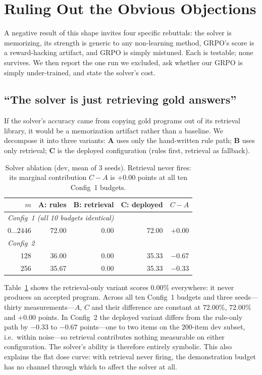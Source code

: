 \section{Ruling Out the Obvious Objections}
\label{sec:analysis}

A negative result of this shape invites four specific rebuttals: the solver is
memorizing, its strength is generic to any non-learning method, GRPO's score is
a reward-hacking artifact, and GRPO is simply mistuned. Each is testable; none
survives. We then report the one run we excluded, ask whether our GRPO is
simply under-trained, and state the solver's cost.

\subsection{``The solver is just retrieving gold answers''}

If the solver's accuracy came from copying gold programs out of its retrieval
library, it would be a memorization artifact rather than a baseline. We
decompose it into three variants: \textbf{A} uses only the hand-written rule
path; \textbf{B} uses only retrieval; \textbf{C} is the deployed configuration
(rules first, retrieval as fallback).

\begin{table}[t]
\centering
\small
\caption{Solver ablation (dev, mean of 3 seeds). Retrieval never fires: its
marginal contribution $C-A$ is $+0.00$ points at all ten Config~1 budgets.}
\label{tab:ablation}
\begin{tabular}{rrrr r}
\toprule
$m$ & A: rules & B: retrieval & C: deployed & $C-A$ \\
\midrule
\multicolumn{5}{l}{\textit{Config~1 (all 10 budgets identical)}} \\
$0 \ldots 2446$ & 72.00 & 0.00 & 72.00 & $+0.00$ \\
\midrule
\multicolumn{5}{l}{\textit{Config~2}} \\
128 & 36.00 & 0.00 & 35.33 & $-0.67$ \\
256 & 35.67 & 0.00 & 35.33 & $-0.33$ \\
\bottomrule
\end{tabular}
\end{table}

Table~\ref{tab:ablation} shows the retrieval-only variant scores $0.00\%$
everywhere: it never produces an accepted program. Across all ten Config~1
budgets and three seeds---thirty measurements---$A$, $C$ and their difference
are constant at $72.00\%$, $72.00\%$ and $+0.00$ points. In Config~2 the
deployed variant differs from the rule-only path by $-0.33$ to $-0.67$
points---one to two items on the 200-item dev subset, i.e.\ within noise---so
retrieval contributes nothing measurable on either configuration. The solver's
ability is therefore entirely symbolic. This
also explains the flat dose curve: with retrieval never firing, the
demonstration budget has no channel through which to affect the solver at all.

